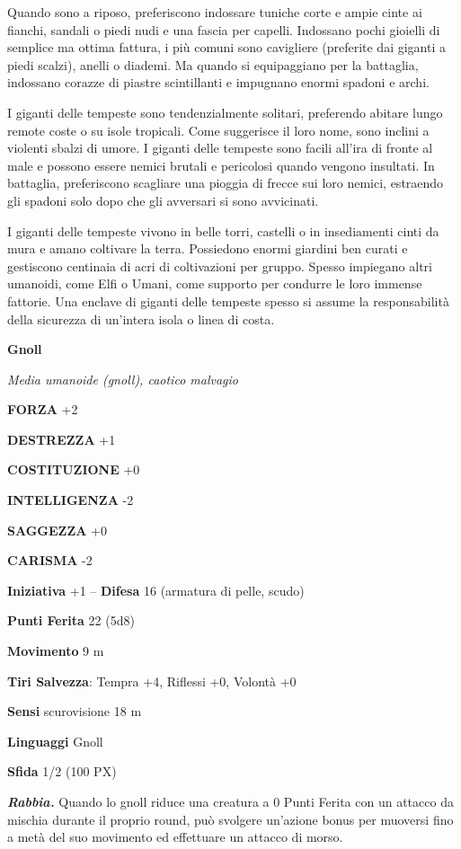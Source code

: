 \begin{multicols}{2}
Quando sono a riposo, preferiscono indossare tuniche corte e ampie cinte ai fianchi, sandali o piedi nudi e una fascia per capelli. Indossano pochi gioielli di semplice ma ottima fattura, i più comuni sono cavigliere (preferite dai giganti a piedi scalzi), anelli o diademi. Ma quando si equipaggiano per la battaglia, indossano corazze di piastre scintillanti e impugnano enormi spadoni e archi.

I giganti delle tempeste sono tendenzialmente solitari, preferendo abitare lungo remote coste o su isole tropicali. Come suggerisce il loro nome, sono inclini a violenti sbalzi di umore. I giganti delle tempeste sono facili all'ira di fronte al male e possono essere nemici brutali e pericolosi quando vengono insultati. In battaglia, preferiscono scagliare una pioggia di frecce sui loro nemici, estraendo gli spadoni solo dopo che gli avversari si sono avvicinati.

I giganti delle tempeste vivono in belle torri, castelli o in insediamenti cinti da mura e amano coltivare la terra. Possiedono enormi giardini ben curati e gestiscono centinaia di acri di coltivazioni per gruppo. Spesso impiegano altri umanoidi, come Elfi o Umani, come supporto per condurre le loro immense fattorie. Una enclave di giganti delle tempeste spesso si assume la responsabilità della sicurezza di un'intera isola o linea di costa.

\medskip{}\textbf{Gnoll}

\textit{Media umanoide (gnoll), caotico malvagio}

\textbf{FORZA} +2

\textbf{DESTREZZA} +1

\textbf{COSTITUZIONE} +0

\textbf{INTELLIGENZA} -2

\textbf{SAGGEZZA} +0

\textbf{CARISMA} -2

\textbf{Iniziativa} +1 -- \textbf{Difesa} 16 (armatura di pelle, scudo)

\textbf{Punti Ferita} 22 (5d8)

\textbf{Movimento} 9 m

\textbf{Tiri Salvezza}: Tempra +4, Riflessi +0, Volontà +0

\textbf{Sensi} scurovisione 18 m

\textbf{Linguaggi} Gnoll

\textbf{Sfida} 1/2 (100 PX)

\textit{\textbf{Rabbia.}} Quando lo gnoll riduce una creatura a 0 Punti Ferita con un attacco da mischia durante il proprio round, può svolgere un'azione bonus per muoversi fino a metà del suo movimento ed effettuare un attacco di morso.


\end{multicols}
